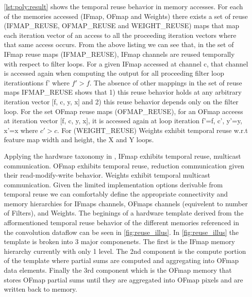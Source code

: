 \autoref{lst:poly:result} shows the temporal reuse behavior in memory accesses. For each
of the memories accessed (IFmap, OFmap and Weights) there exists a set of reuse
(IFMAP\_REUSE, OFMAP\_REUSE and WEIGHT\_REUSE) maps that map each iteration
vector of an access to all the proceeding iteration vectors where that same
access occurs. From the above listing we can see that, in the set of IFmap reuse
maps (IFMAP\_REUSE), IFmap channels are reused temporally with respect to filter
loops. For a given IFmap accessed at channel c, that channel is accessed again
when computing the output for all proceeding filter loop iterationtions f' where
$f'>f$. The absence of other mappings in the set of reuse maps IFMAP\_REUSE shows
that 1) this reuse behavior holds at any arbitrary iteration vector [f, c, y, x]
and 2) this reuse behavior depends only on the filter loop. For the set OFmap
reuse maps (OFMAP\_REUSE), for an OFmap acceess at iteration vector [f, c, y,
x], it is accessed again at loop iteration f'=f, c', y'=y, x'=x where $c'>c$.  
For (WEIGHT\_REUSE) Weights exhibit temporal reuse w.r.t feature map width and
height, the X and Y loops. 

Applying the hardware taxonomy in \cite{maestro}, IFmap exhibits temporal reuse,
multicast communication. OFmap exhibits temporal reuse, reduction communication
given their read-modify-write behavior. Weights exhibit temporal multicast
communication. Given the limited implementation options derivable from temporal
reuse we can comfortably define the appropriate connectivity and memory
hierarchies for IFmaps channels, OFmaps channels (equivelent to number of
Filters), and Weights. The beginings of a hardware template derived from the
afformentioned temporal reuse behavior of the different memories referenced in
the convolution dataflow can be seen in \ref{fig:reuse_illus}. In
\ref{fig:reuse_illus} the template is broken into 3 major componenets. The first
is the IFmap memory hierarchy currently with only 1 level. The 2nd component is
the compute portion of the template where partial sums are computed and
aggregating into OFmap data elements. Finally the 3rd component which is the
OFmap memory that stores OFmap partial sums until they are aggregated into OFmap
pixels and are written back to memory.


